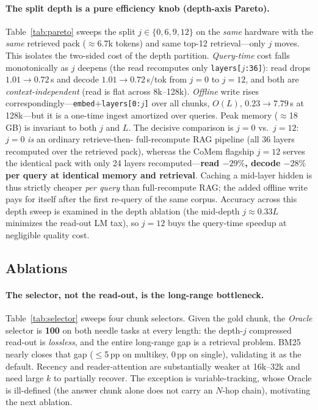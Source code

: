 

\paragraph{The split depth is a pure efficiency knob (depth-axis Pareto).}
Table~\ref{tab:pareto} sweeps the split $j\in\{0,6,9,12\}$ on the \emph{same}
hardware with the \emph{same} retrieved pack ($\approx$6.7k tokens) and same
top-12 retrieval---only $j$ moves. This isolates the two-sided cost of the depth
partition. \emph{Query-time} cost falls monotonically as $j$ deepens (the read
recomputes only \texttt{layers[$j$:36]}): read drops $1.01{\to}0.72$\,s and
decode $1.01{\to}0.72$\,s/tok from $j{=}0$ to $j{=}12$, and both are
\emph{context-independent} (read is flat across 8k--128k). \emph{Offline} write
rises correspondingly---\texttt{embed$+$layers[0:$j$]} over all chunks, $O(L)$,
$0.23{\to}7.79$\,s at 128k---but it is a one-time ingest amortized over queries.
Peak memory ($\approx$18\,GB) is invariant to both $j$ and $L$. The decisive
comparison is $j{=}0$ vs.\ $j{=}12$: $j{=}0$ \emph{is} an ordinary retrieve-then-
full-recompute RAG pipeline (all 36 layers recomputed over the retrieved pack),
whereas the CoMem flagship $j{=}12$ serves the identical pack with only 24 layers
recomputed---\textbf{read $-29\%$, decode $-28\%$ per query at identical memory
and retrieval}. Caching a mid-layer hidden is thus strictly cheaper \emph{per
query} than full-recompute RAG; the added offline write pays for itself after the
first re-query of the same corpus. Accuracy across this depth sweep is examined in
the depth ablation (the mid-depth $j{\approx}0.33L$ minimizes the read-out LM tax),
so $j{=}12$ buys the query-time speedup at negligible quality cost.



\subsection{Ablations}
\paragraph{The selector, not the read-out, is the long-range bottleneck.}
Table~\ref{tab:selector} sweeps four chunk selectors. Given the gold chunk, the
\emph{Oracle} selector is \textbf{100} on both needle tasks at every length: the
depth-$j$ compressed read-out is \emph{lossless}, and the entire long-range gap
is a retrieval problem. BM25 nearly closes that gap ($\le$5\,pp on multikey,
0\,pp on single), validating it as the default. Recency and reader-attention are
substantially weaker at 16k--32k and need large $k$ to partially recover. The
exception is variable-tracking, whose Oracle is ill-defined (the answer chunk
alone does not carry an $N$-hop chain), motivating the next ablation.


